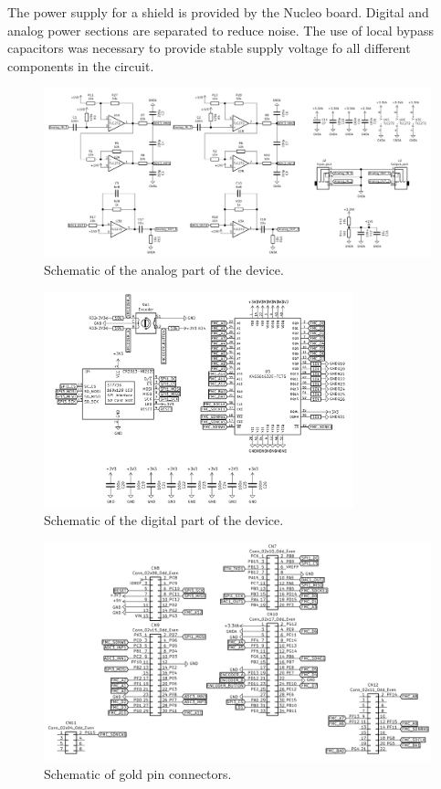 \documentclass[a4paper,twoside,12pt]{book}
\begin{document}
The power supply for a shield is provided by the Nucleo board.
Digital and analog power sections are separated to reduce noise.
The use of local bypass capacitors was necessary to provide stable
supply voltage fo all different components in the circuit.

\begin{figure}[H]
    \centering
    \includegraphics[width=\textwidth]{images/Schematic_analog}
    \caption{Schematic of the analog part of the device.}
    \label{fig:Schematic1}
\end{figure}

\begin{figure}[H]
    \centering
    \includegraphics[width=0.8\textwidth]{images/Schematic_digital}
    \caption{Schematic of the digital part of the device.}
    \label{fig:Schematic2}
\end{figure}

\begin{figure}[H]
    \centering
    \includegraphics[width=\textwidth]{images/Schematic_connectors}
    \caption{Schematic of gold pin connectors.}
    \label{fig:Schematic3}
\end{figure}
\end{document}
